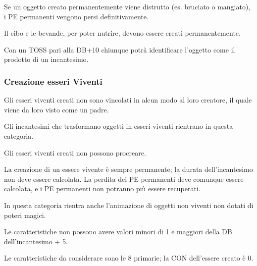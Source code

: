 Se un oggetto creato permanentemente viene distrutto (es. bruciato o
mangiato), i PE permanenti vengono persi definitivamente.

Il cibo e le bevande, per poter nutrire, devono essere creati
permanentemente.

Con un TOSS pari alla DB+10 chiunque potr\`a identificare l'oggetto
come il prodotto di un incantesimo.





\iffullversion
\subsubsection{Creazione esseri Viventi} Gli esseri viventi creati non sono
vincolati in alcun modo al loro creatore, il quale viene da loro visto come un padre.

Gli incantesimi che trasformano oggetti in esseri viventi rientrano in
questa categoria. 

Gli esseri viventi creati non possono procreare. 

La creazione di un essere vivente \`e sempre permanente; la durata
dell'incantesimo non deve essere calcolata. La perdita dei PE
permanenti deve comunque essere calcolata, e i PE permanenti non
potranno pi\`u essere recuperati.

In questa categoria rientra anche l'animazione di oggetti non viventi
non dotati di poteri magici.

Le caratteristiche non possono avere valori minori di 1 e
maggiori della DB dell'incantesimo + 5. 

Le caratteristiche da considerare sono le 8 primarie; la CON
dell'essere creato \`e 0.

